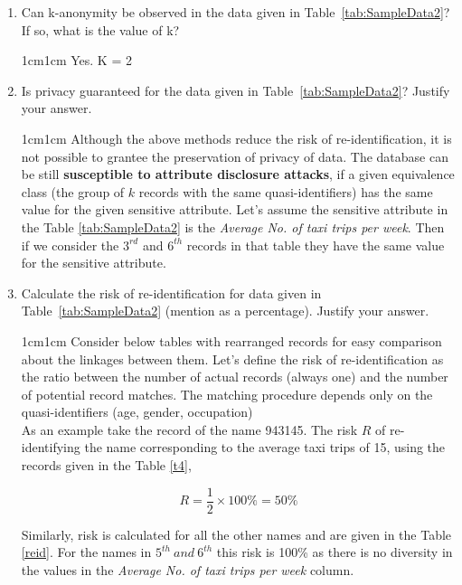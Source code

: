 \documentclass[11pt,letterpaper]{article}
\newenvironment{answer}{\em \color{blue} \begin{adjustwidth}{1cm}{1cm}}{\end{adjustwidth}}
\begin{document}
\begin{enumerate}
		\item Can k-anonymity be observed in the data given in Table~\ref{tab:SampleData2}? If so, what is the value of k?
		
		\begin{answer}
			Yes. K = 2
		\end{answer}
		
		\item Is privacy guaranteed for the data given in Table~\ref{tab:SampleData2}? Justify your answer.
		
		\begin{answer}
			Although the above methods reduce the risk of re-identification, it is not possible to grantee the preservation of privacy of data. The database can be still \textbf{susceptible to attribute disclosure attacks}, if a given equivalence class (the group of $k$ records with the same quasi-identifiers) has the same value for the given sensitive attribute. Let's assume the sensitive attribute in the Table \ref{tab:SampleData2} is the \textit{Average No. of taxi trips per week}. Then if we consider the $3^{rd}$ and $6^{th}$ records in that table they have the same value for the sensitive attribute. 
		\end{answer}
		
		\pagebreak
		\item Calculate the risk of re-identification for data given in Table~\ref{tab:SampleData2} (mention as a percentage). Justify your answer.
		
		\begin{answer}
			Consider below tables with rearranged records for easy comparison about the linkages between them. Let's define the risk of re-identification as the ratio between the number of actual records (always one) and the number of potential record matches. The matching procedure depends only on the quasi-identifiers (age, gender, occupation)\\
			
			As an example take the record of the name 943145. The risk $R$ of re-identifying the name corresponding to the average taxi trips of 15, using the records given in the Table \ref{t4},
			
			\[
			R = \frac{1}{2} \times 100\% = 50\%
			\]
			
			
			Similarly, risk is calculated for all the other names and are given in the Table \ref{reid}. For the names in $5^{th} ~and ~6^{th}$ this risk is 100\% as there is no diversity in the values in the \textit{Average No. of taxi trips per week} column.
			

\end{answer}
\end{enumerate}
\end{document}
